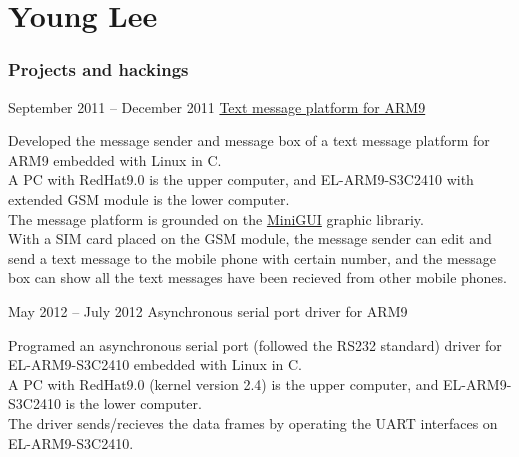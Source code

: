 \documentclass{tccv}
\begin{document}
\part{Young Lee}

\section{Projects and hackings}    %

\begin{eventlist}


\item{September 2011 -- December 2011}
  {}
  {\href{https://github.com/YoungLeeNENU/MessagePlatform}{Text message platform for ARM9}}

  Developed the message sender and message box of a text message platform for ARM9 embedded with Linux in C. \\
  A PC with RedHat9.0 is the upper computer, and EL-ARM9-S3C2410 with extended GSM module is the lower computer. \\
  The message platform is grounded on the \href{http://www.minigui.org/en/}{MiniGUI} graphic librariy. \\
  With a SIM card placed on the GSM module, the message sender can edit and send a text message to the mobile phone with certain number,
  and the message box can show all the text messages have been recieved from other mobile phones.

  
\item{May 2012 -- July 2012}
  {}
  {Asynchronous serial port driver for ARM9}

  Programed an asynchronous serial port (followed the RS232 standard) driver for EL-ARM9-S3C2410 embedded with Linux in C. \\
  A PC with RedHat9.0 (kernel version 2.4) is the upper computer, and EL-ARM9-S3C2410 is the lower computer. \\
  The driver sends/recieves the data frames by operating the UART interfaces on EL-ARM9-S3C2410.



\end{eventlist}
\end{document}
